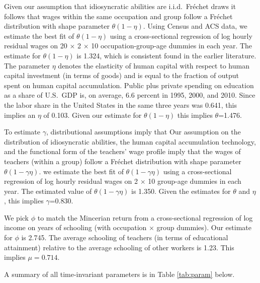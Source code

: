 \documentclass[onehalfspacing,11pt]{article}
\begin{document}
	Given our assumption that idiosyncratic abilities are i.i.d.~Fr\'echet draws it follows that wages within the same occupation and group follow a Fr\'echet distribution with shape parameter $\theta(1-\eta)$. Using Census and ACS data, we estimate the best fit of $\theta(1-\eta)$ using a cross-sectional regression of log hourly residual wages on 20 $\times$ 2 $\times$ 10 occupation-group-age dummies in each year. The estimate for $\theta(1-\eta)$ is 1.324, which is consistent found in the earlier literature. The parameter $\eta$ denotes the elasticity of human capital with respect to human capital investment (in terms of goods) and is equal to the fraction of output spent on human capital accumulation. Public plus private spending on education as a share of U.S.~GDP is, on average, 6.6 percent in 1995, 2000, and 2010. Since the labor share in the United States in the same three years was 0.641, this implies an $\eta$ of 0.103. Given our estimate for $\theta(1-\eta)$ this implies $\theta$=1.476.
	
	To estimate $\gamma$, distributional assumptions imply that 
	Our assumption on the distribution of idiosyncratic abilities, the human capital accumulation technology, and the functional form of the teachers' wage profile imply that the wages of teachers (within a group) follow a Fr\'echet distribution with shape parameter $\theta(1-\gamma\eta)$. we estimate the best fit of $\theta(1-\gamma\eta)$ using a cross-sectional regression of log hourly residual wages on 2 $\times$ 10 group-age dummies in each year. The estimated value of $\theta(1-\gamma\eta)$ is 1.350. Given the estimates for $\theta$ and $\eta$, this implies $\gamma$=0.830.
	
	We pick $\phi$ to match the Mincerian return from a cross-sectional regression of log income on years of schooling (with occupation $\times$ group dummies). Our estimate for $\phi$ is 2.745. The average schooling of teachers (in terms of educational attainment) relative to the average schooling of other workers is 1.23. This implies $\mu=0.714$.
	
	A summary of all time-invariant parameters is in Table \ref{tab:param} below.
	
\end{document}
